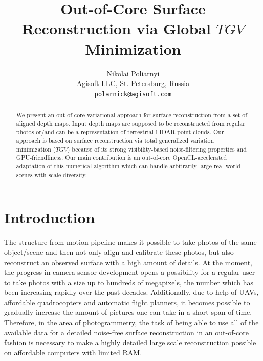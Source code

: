 \documentclass[10pt,twocolumn,letterpaper]{article}
\begin{document}
\title{Out-of-Core Surface Reconstruction via Global $TGV$ Minimization}

\author{Nikolai Poliarnyi\\
Agisoft LLC, St. Petersburg, Russia\\
{\tt\small polarnick@agisoft.com}
}

\maketitle
\ificcvfinal\thispagestyle{empty}\fi

\begin{abstract}
We present an out-of-core variational approach for surface reconstruction from a set of aligned depth maps.
Input depth maps are supposed to be reconstructed from regular photos or/and can be a representation of terrestrial LIDAR point clouds.
Our approach is based on surface reconstruction via total generalized variation minimization ($TGV$) because of its strong visibility-based noise-filtering properties and GPU-friendliness.
Our main contribution is an out-of-core OpenCL-accelerated adaptation of this numerical algorithm which can handle arbitrarily large real-world scenes with scale diversity.

\end{abstract}

\section{Introduction}

The structure from motion pipeline makes it possible to take photos of the same object/scene
and then not only align and calibrate these photos, but also reconstruct an observed surface with a high amount of details.
At the moment, the progress in camera sensor development opens a possibility for a regular user to take photos with a size up to hundreds of megapixels, the number which has been increasing rapidly over the past decades. Additionally, due to help of UAVs, affordable quadrocopters and automatic flight planners,
it becomes possible to gradually increase the amount of pictures one can take in a short span of time.
Therefore, in the area of photogrammetry, the task of being able to use all of the available data for a detailed noise-free surface reconstruction in an out-of-core fashion is necessary to make a highly detailed large scale reconstruction possible on affordable computers with limited RAM.
\end{document}

